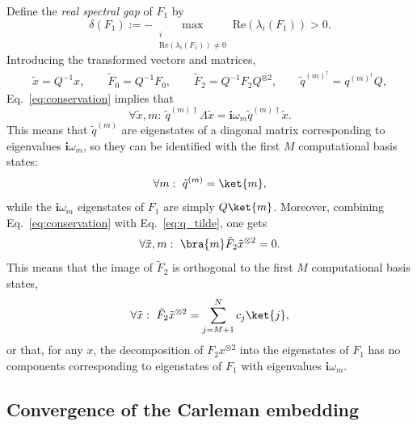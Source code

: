 \documentclass[superscriptaddress,onecolumn,nofootinbib,longbibliography,a4paper,accepted=2026-09-29]{quantumarticle}
\theoremstyle{plain}
\theoremstyle{definition}
\numberwithin{thm}{section}
\numberwithin{assumption}{section}
\numberwithin{lemma}{section}
\numberwithin{prop}{section}
\numberwithin{cor}{section}
\numberwithin{definition}{section}
\numberwithin{rmk}{section}
\numberwithin{equation}{section}
\renewcommand{\i}{\ensuremath{\mathbf{i}}}
\begin{document}
Define the \emph{real spectral gap} of $F_1$ by 
\begin{equation}
    \label{eq:real_spectral}
    \delta(F_1):= -\!\!\!\!\!\!\!\max\limits_{\substack{i\\\mathrm{Re}(\lambda_i(F_1))\neq 0}} \mathrm{Re}(\lambda_i(F_1) )> 0.
\end{equation}
Introducing the transformed vectors and matrices,
\begin{align}
    \tilde{x} = Q^{-1}x,\qquad \tilde{F}_0 = Q^{-1} F_0,\qquad \tilde{F}_2 = Q^{-1} F_2 Q^{\otimes 2},\qquad \tilde{q}^{(m)^\dagger} = {q}^{(m)^\dagger} Q,
\end{align}
Eq.~\eqref{eq:conservation} implies that
\begin{equation}
    \forall \tilde{x},m:~ \tilde{q}^{(m)\dagger}\Lambda \tilde{x} = {\i \omega_m \tilde{q}^{(m)\dagger} \tilde{x}}.
\end{equation}
This means that $\tilde{q}^{(m)}$ are eigenstates of a diagonal matrix corresponding to eigenvalues $\i\omega_m$, so they can be identified with the first $M$ computational basis states:
\begin{equation}
    \label{eq:q_tilde}
    \forall m:~\tilde{q}^{(m)} = \ket{m},
\end{equation}
while the $\i \omega_m$ eigenstates of $F_1$ are simply $Q\ket{m}$. Moreover, combining Eq.~\eqref{eq:conservation} with Eq.~\eqref{eq:q_tilde}, one gets
\begin{equation}
    \label{eq:F2_cons_zero}
    \forall \tilde{x},m:~ \bra{m}\tilde{F}_2 \tilde{x}^{\otimes 2} =0.
\end{equation}
This means that the image of $\tilde{F}_2$ is orthogonal to the first $M$ computational basis states,
\begin{equation}
    \label{eq:f2_cons}
    \forall \tilde{x}:~\tilde{F}_2 \tilde{x}^{\otimes 2} = \sum_{j=M+1}^N c_j \ket{j},
\end{equation}
or that, for any $x$, the decomposition of $F_2 x^{\otimes 2}$ into the eigenstates of $F_1$ has no components corresponding to eigenstates of $F_1$ with eigenvalues $\i\omega_m$.


\subsection{Convergence of the Carleman embedding}
\end{document}
